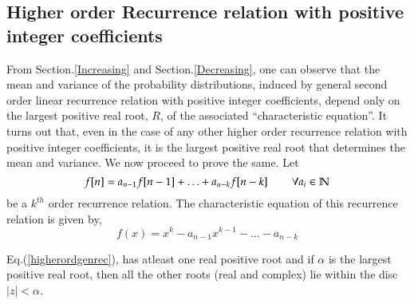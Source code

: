 \begin{multicols}{2}
\section{Higher order Recurrence relation with positive integer coefficients}\label{section-11}
From Section.\ref{Increasing} and Section.\ref{Decreasing}, one can observe that the mean and variance of the probability distributions, induced by general second order linear recurrence relation with positive integer coefficients, depend only on the largest positive real root, $R$, of the associated ``characteristic equation''. It turns out that, even in the case of any other higher order recurrence relation with positive integer coefficients, it is the largest positive real root that determines the mean and variance. We now proceed to prove the same.
Let 
\begin{equation}
 f[n] = a_{n-1}f[n-1] + \ldots + a_{n-k}f[n-k] \hspace{0.3in} \forall a_i \in \mathbb{N}\label{eq-11.1}
\end{equation}
be a $k^{th}$ order recurrence relation. The characteristic equation of this recurrence relation is given by,
 \begin{equation}
    f(x) = x^k - a_{n-1}x^{k-1}- \ldots - a_{n-k}\label{eq-11.2}
 \end{equation}
\begin{lem}\label{lemma-1}
Eq.(\ref{higherordgenrec}), has atleast one real positive root and if $\alpha$ is the largest positive real root, then all the other roots (real and complex) lie within the disc $|z| < \alpha$.
\end{lem}


\end{multicols}
